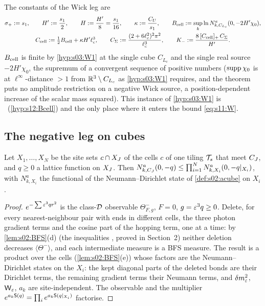 The constants of the Wick leg are
\begin{equation}\label{eq:s11:constants}
\begin{gathered}
\sigma_+:= s_1,\qquad H':=\frac{s_1}2,\qquad H:=\frac{H'}8=\frac{s_1}{16},\qquad \kappa:=\frac{C_U}{s_1},\qquad B_{\rm cell}:=\sup_k\ln N^a_{k,C_{L_c}}(0,-2H'\chi_0),\\
C_{\rm cell}:=\tfrac12B_{\rm cell}+\kappa H'\ell_c^3,\qquad C_\Sigma:=\frac{(2+6\ell_c^2)^2\pi^2}{\ell_c^3},\qquad K_-:=\frac{8\,[C_{\rm cell}]_+\,C_\Sigma}{H'} .
\end{gathered}
\end{equation}
$B_{\rm cell}$ is finite by \cref{hyp:s03:W1} at the single cube $C_{L_c}$ and the single real source $-2H'\chi_0$, the supremum of a convergent sequence of positive numbers ($\operatorname{supp}\chi_0$ is at $\ell^\infty$-distance $>1$ from $\mathbb R^3\setminus C_{L_c}$ as \cref{hyp:s03:W1} requires, and the theorem puts no amplitude restriction on a negative Wick source, a position-dependent increase of the scalar mass squared). This instance of \cref{hyp:s03:W1} is \Bcell\ (\cref{hyp:s12:Bcell}) and the only place where it enters the bound \eqref{eq:s11:W}.

\subsection{The negative leg on cubes}

\begin{lemma}\label{lem:s11:W3}
Let $X_1,\dots,X_N$ be the site sets $c\cap X_J$ of the cells $c$ of one tiling $\mathcal T_s$ that meet $C_J$, and $q\ge0$ a lattice function on $X_J$. Then $N^a_{k,C_J}(0,-q)\le\prod_{i=1}^NN^a_{k,X_i}(0,-q|_{X_i})$, with $N^a_{k,X_i}$ the functional of the Neumann--Dirichlet state of \cref{def:s02:acube} on $X_i$.
\end{lemma}

\begin{proof}
$e^{-\sum\varepsilon^3qr^2}$ is the class-$\mathcal D$ observable $\Theta^-_{F,g}$, $F=0$, $g=\varepsilon^3q\ge0$. Delete, for every nearest-neighbour pair with ends in different cells, the three photon gradient terms and the cosine part of the hopping term, one at a time: by \cref{lem:s02:BFS}(d) (the inequalities \cite[Thm.~6.2(3),(4)]{BFS1}, proved in Section~2) neither deletion decreases $\langle\Theta^-\rangle$, and each intermediate measure is a BFS measure. The result is a product over the cells (\cref{lem:s02:BFS}(e)) whose factors are the Neumann--Dirichlet states on the $X_i$: the kept diagonal parts of the deleted bonds are their Dirichlet terms, the remaining gradient terms their Neumann terms, and $\delta m^2_{\varepsilon}$, $\mathsf W_{\varepsilon}$, $a_k$ are site-independent. The observable and the multiplier $e^{a_k\mathsf S(q)}=\prod_ie^{a_k\mathsf S(q|_{X_i})}$ factorise.
\end{proof}

